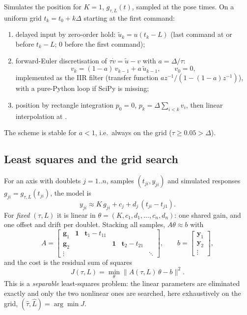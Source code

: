 Simulates the position for $K = 1$, $g_{\tau,L}(t)$, sampled at the pose times. On a uniform grid
$t_k = t_0 + k\Delta$ starting at the first command:
\begin{enumerate}[nosep]
\item delayed input by zero-order hold: $\tilde u_k = u(t_k - L)$ (last command at or before $t_k-L$; $0$ before
the first command);
\item forward-Euler discretisation of $\tau\dot v = \tilde u - v$ with $a = \Delta/\tau$:
$$
v_k = (1-a)\,v_{k-1} + a\,\tilde u_{k-1}, \qquad v_0 = 0,
$$
implemented as the IIR filter  (transfer function $a z^{-1}/(1-(1-a)z^{-1})$),
with a pure-Python loop if SciPy is missing;
\item position by rectangle integration $p_0 = 0$, $p_k = \Delta\sum_{i<k} v_i$, then linear interpolation at
.
\end{enumerate}
The scheme is stable for $a<1$, i.e.\ always on the grid ($\tau \ge 0.05 > \Delta$).

\subsection{Least squares and the grid search}

For an axis with doublets $j = 1..n$, samples $(t_{ji}, y_{ji})$ and simulated responses $g_{ji} = g_{\tau,L}(t_{ji})$,
the model is
$$
y_{ji} \approx K\,g_{ji} + c_j + d_j\,(t_{ji} - t_{j1}).
$$
For \emph{fixed} $(\tau, L)$ it is linear in $\theta = (K, c_1, d_1, \dots, c_n, d_n)$: one shared gain, and one
offset and drift per doublet. Stacking all samples, $A\theta \approx b$ with
$$
A = \begin{bmatrix}
\mathbf g_1 & \mathbf 1 & \mathbf t_1 - t_{11} & & & \\
\mathbf g_2 & & & \mathbf 1 & \mathbf t_2 - t_{21} & \\
\vdots & & & & & \ddots
\end{bmatrix},\qquad b = \begin{bmatrix}\mathbf y_1\\ \mathbf y_2\\ \vdots\end{bmatrix},
$$
and the cost is the residual sum of squares
$$
J(\tau, L) = \min_\theta \lVert A(\tau, L)\,\theta - b\rVert^2 .
$$
This is a \emph{separable} least-squares problem: the linear parameters are eliminated exactly and only the two
nonlinear ones are searched, here exhaustively on the grid, $(\hat\tau, \hat L) = \arg\min J$.

